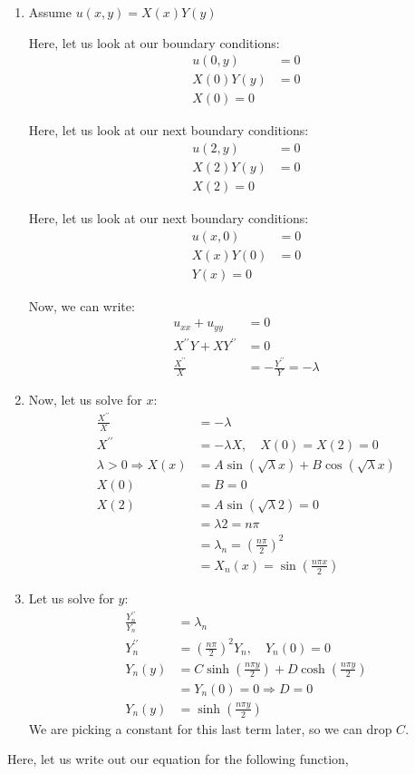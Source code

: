 \begin{enumerate}
  \item Assume $u(x, y) = X(x)Y(y)$

  Here, let us look at our boundary conditions:
  \begin{align}
    u(0, y) & = 0\\
    X(0)Y(y) & = 0\\
    X(0) = 0
  \end{align}

  Here, let us look at our next boundary conditions:
  \begin{align}
    u(2, y) & = 0\\
    X(2)Y(y) & = 0\\
    X(2) = 0
  \end{align}

  Here, let us look at our next boundary conditions:
  \begin{align}
    u(x, 0) & = 0\\
    X(x)Y(0) & = 0\\
    Y(x) = 0
  \end{align}

  Now, we can write:
  \begin{align}
    u_{xx} + u_{yy} & = 0\\
    X^{\prime\prime}Y + XY^{\prime\prime} & = 0\\
    \frac{X^{\prime\prime}}{X} & = -\frac{Y^{\prime\prime}}{Y} = - \lambda
  \end{align}
  \item Now, let us solve for $x$:
  \begin{align}
    \frac{X^{\prime\prime}}{X} & = -\lambda\\
    X^{\prime\prime} & = - \lambda X, \quad X(0) = X(2) = 0\\
    \lambda > 0 \Rightarrow X(x) & = A \sin(\sqrt \lambda x) + B \cos(\sqrt \lambda x)\\
    X(0) & = B = 0\\
    X(2) & = A \sin(\sqrt \lambda 2) = 0\\
    & = \lambda 2 = n \pi\\
    & = \lambda_n = \left( \frac{n \pi}{2} \right)^2\\
    & = X_n(x) =  \sin(\frac{n \pi x}{2})
  \end{align}
  \item Let us solve for $y$:
  \begin{align}
    \frac{Y^{\prime\prime}_n}{Y_n} & = \lambda_n\\
    Y^{\prime\prime}_n & = \left(\frac{n \pi}{2}\right)^2 Y_n, \quad Y_n(0) = 0\\
    Y_n(y) & = C \sinh \left( \frac{n \pi y}{2} \right) + D \cosh \left( \frac{n \pi y}{2} \right)\\
    & = Y_n(0) = 0 \Rightarrow D = 0\\
    Y_n(y) & = \sinh \left( \frac{n \pi y}{2} \right)
  \end{align}
  We are picking a constant for this last term later, so we can drop $C$.
\end{enumerate}
Here, let us write out our equation for the following function,

